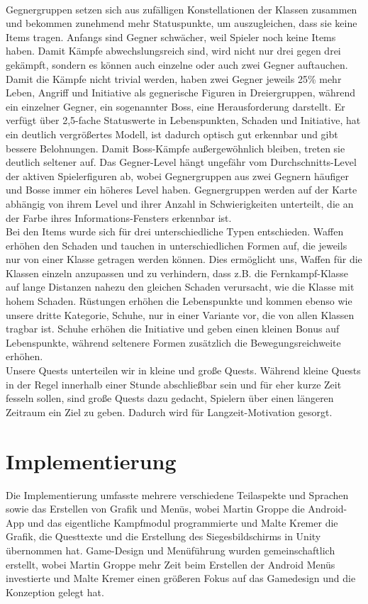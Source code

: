 \documentclass[extern,palatino]{cgBA}
\begin{document}
\\Gegnergruppen setzen sich aus zufälligen Konstellationen der Klassen zusammen und bekommen zunehmend mehr Statuspunkte, um auszugleichen, dass sie keine Items tragen. Anfangs sind Gegner schwächer, weil Spieler noch keine Items haben. Damit Kämpfe abwechslungsreich sind, wird nicht nur drei gegen drei gekämpft, sondern es können auch einzelne oder auch zwei Gegner auftauchen. Damit die Kämpfe nicht trivial werden, haben zwei Gegner jeweils 25\% mehr Leben, Angriff und Initiative als gegnerische Figuren in Dreiergruppen, während ein einzelner Gegner, ein sogenannter Boss, eine Herausforderung darstellt. Er verfügt über 2,5-fache Statuswerte in Lebenspunkten, Schaden und Initiative, hat ein deutlich vergrößertes Modell, ist dadurch optisch gut erkennbar und gibt bessere Belohnungen. Damit Boss-Kämpfe außergewöhnlich bleiben, treten sie deutlich seltener auf. Das Gegner-Level hängt ungefähr vom Durchschnitts-Level der aktiven Spielerfiguren ab, wobei Gegnergruppen aus zwei Gegnern häufiger und Bosse immer ein höheres Level haben. Gegnergruppen werden auf der Karte abhängig von ihrem Level und ihrer Anzahl in Schwierigkeiten unterteilt, die an der Farbe ihres Informations-Fensters erkennbar ist.
\\Bei den Items wurde sich für drei unterschiedliche Typen entschieden. Waffen erhöhen den Schaden und tauchen in unterschiedlichen Formen auf, die jeweils nur von einer Klasse getragen werden können. Dies ermöglicht uns, Waffen für die Klassen einzeln anzupassen und zu verhindern, dass z.B. die Fernkampf-Klasse auf lange Distanzen nahezu den gleichen Schaden verursacht, wie die Klasse mit hohem Schaden. Rüstungen erhöhen die Lebenspunkte und kommen ebenso wie unsere dritte Kategorie, Schuhe, nur in einer Variante vor, die von allen Klassen tragbar ist. Schuhe erhöhen die Initiative und geben einen kleinen Bonus auf Lebenspunkte, während seltenere Formen zusätzlich die Bewegungsreichweite erhöhen.
\\Unsere Quests unterteilen wir in kleine und große Quests. Während kleine Quests in der Regel innerhalb einer Stunde abschließbar sein und für eher kurze Zeit fesseln sollen, sind große Quests dazu gedacht, Spielern über einen längeren Zeitraum ein Ziel zu geben. Dadurch wird für Langzeit-Motivation gesorgt.
\newpage
\section{Implementierung}
Die Implementierung umfasste mehrere verschiedene Teilaspekte und Sprachen sowie das Erstellen von Grafik und Menüs, wobei Martin Groppe die Android-App und das eigentliche Kampfmodul programmierte und Malte Kremer die Grafik, die Questtexte und die Erstellung des Siegesbildschirms in Unity übernommen hat. Game-Design und Menüführung wurden gemeinschaftlich erstellt, wobei Martin Groppe mehr Zeit beim Erstellen der Android Menüs investierte und Malte Kremer einen größeren Fokus auf das Gamedesign und die Konzeption gelegt hat.
\end{document}
